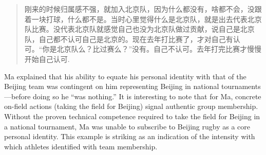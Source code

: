 \begin{CJK}{UTF8}{gbsn}
    \begin{quote}
      刚来的时候归属感不强，就加入北京队，因为什么都没有，啥都不会，没跟着一块打球，什么都不是。当时心里觉得什么是北京队，就是出去代表北京队比赛。没代表北京队就感觉自己也没为北京队做过贡献，说自己是北京队，自己都不认可自己是北京的。现在去年打比赛了，才对自己有认可。“你是北京队么？比过赛么？”没有。自己不认可。去年打完比赛才慢慢开始自己认可.
    \end{quote}

Ma explained that his ability to equate his personal identity with that of the Beijing team was contingent on him representing Beijing in national tournaments---before doing so he ``was nothing.''  It is interesting to note that for Ma, concrete on-field actions (taking the field for Beijing) signal authentic group membership.  Without the proven technical competence required to take the field for Beijing in a national tournament, Ma was unable to subscribe to Beijing rugby as a core personal identity. This example is striking as an indication of the intensity with which athletes identified with team membership.


\end{CJK}
